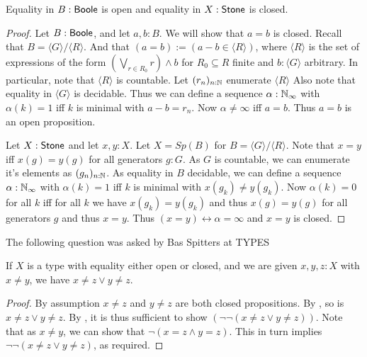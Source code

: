 \begin{lemma}\label{EqualityBooleStoneClosedOpen}
  Equality in $B:\mathsf{Boole}$ is open and equality in $X:\mathsf{Stone}$ is closed. 
\end{lemma}
\begin{proof}
  Let $B:\mathsf{Boole}$, and let $a,b:B$. We will show that $a=b$ is closed. 
  Recall that $B = \langle G \rangle / \langle R \rangle$. 
  And that $(a=b):= (a-b \in \langle R \rangle)$, 
  where $\langle R \rangle$ is the set of expressions of the form
  $(\bigvee_{r\in R_0} r) \wedge b$ for $R_0\subseteq R$ finite and $b:\langle G \rangle$ 
  arbitrary. 
  In particular, note that $\langle R \rangle$ is countable. 
  Let $(r_n)_{n:\mathbb{N}}$ enumerate $ \langle R \rangle $
  Also note that equality in $\langle G \rangle$ is decidable. 
  Thus we can define a sequence $\alpha:\mathbb{N}_{\infty}$ with $\alpha(k) = 1$ 
  iff $k$ is minimal with $a -b = r_n$. 
  Now $\alpha \neq \infty $ iff $a = b$. Thus $a=b$ is an open proposition. 

  Let $X:\mathsf{Stone}$ and let $x,y:X$. 
  Let $X= Sp(B)$ for $B = \langle G \rangle / \langle R \rangle $. 
  Note that $x=y$ iff $x(g) = y(g)$ for all generators $g:G$. 
  As $G$ is countable, we can enumerate it's elements as $(g_n)_{n:\mathbb{N}}$. 
  As equality in $B$ decidable, we can define a sequence $\alpha:\mathbb{N}_{\infty}$ 
  with $\alpha(k) = 1$ iff $k$ is minimal with $x(g_k) \neq y(g_k)$. 
  Now $\alpha(k) = 0$ for all $k$ iff for all $k$ we have $x(g_k) = y(g_k)$ and thus $x(g) = y(g)$ for all generators $g$ 
  and thus $ x= y$. 
  Thus $(x=y) \leftrightarrow \alpha= \infty$ and $ x=y$ is closed. 
\end{proof}

The following question was asked by Bas Spitters at TYPES
\begin{lemma}[Apartness]
  If $X$ is a type with equality either open or closed, and we are given $x,y,z:X$ with $x \neq y$, we have 
  $x\neq z \vee y \neq z$.  
\end{lemma}
\begin{proof}
  By assumption $x\neq z$ and $ y \neq z$ are both closed propositions. 
  By , so is $x \neq z \vee y \neq z$. 
  By , it is thus sufficient to show 
  $(\neg \neg (x \neq z \vee y \neq z))$.
  Note that as $x\neq y$, we can show that $\neg ( x = z \wedge y = z)$. 
  This in turn implies $\neg \neg ( x \neq  z \vee y \neq  z)$, as required. 
\end{proof}

